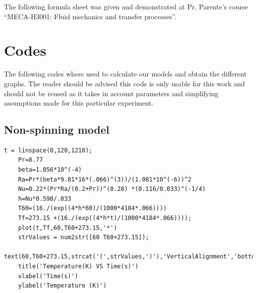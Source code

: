 \documentclass{report}
\begin{document}
	The following formula sheet was given and demonstrated at Pr. Parente's course ``MECA-H3001: Fluid mechanics and transfer processes''.
	
	
	
	\chapter{Codes}
	
	The following codes where used to calculate our models and obtain the different graphs. The reader should be advised this code is only usable for this work and should not be reused as it takes in account parameters and simplifying assumptions made for this particular experiment.
	
	\section{Non-spinning model}\label{codeNS}
	
	\begin{lstlisting}[style=Matlab-editor]
	t = linspace(0,120,1210);
	Pr=8.77
	beta=1.056*10^(-4)
	Ra=Pr*(beta*9.81*16*(.066)^(3))/(1.081*10^(-6))^2
	Nu=0.22*(Pr*Ra/(0.2+Pr))^(0.28) *(0.116/0.033)^(-1/4)
	h=Nu*0.598/.033
	T60=(16./(exp((4*h*60)/(1000*4184*.066))))
	Tf=273.15 +(16./(exp((4*h*t)/(1000*4184*.066))));
	plot(t,Tf,60,T60+273.15,'*')
	strValues = num2str([60 T60+273.15]);
	text(60,T60+273.15,strcat('(',strValues,')'),'VerticalAlignment','bottom');
	title('Temperature(K) VS Time(s)')
	xlabel('Time(s)')
	ylabel('Temperature (K)')
	\end{lstlisting}
	
	
	{}
	
	
\end{document}
